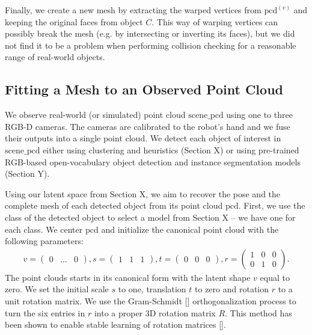 \documentclass{article}
\newcommand{\pcx}[1]{\mathrm{pcd}^{(#1)}}
\begin{document}
Finally, we create a new mesh by extracting the warped vertices from $\pcx{v}$ and keeping the original faces from object $C$. This way of warping vertices can possibly break the mesh (e.g. by intersecting or inverting its faces), but we did not find it to be a problem when performing collision checking for a reasonable range of real-world objects.

\subsection{Fitting a Mesh to an Observed Point Cloud}
\label{sec:methods:scene}

We observe real-world (or simulated) point cloud $\mathrm{scene\_pcd}$ using one to three RGB-D cameras. The cameras are calibrated to the robot's hand and we fuse their outputs into a single point cloud. We detect each object of interest in $\mathrm{scene\_pcd}$ either using clustering and heuristics (Section X) or using pre-trained RGB-based open-vocabulary object detection and instance segmentation models (Section Y).

Using our latent space from Section X, we aim to recover the pose and the complete mesh of each detected object from its point cloud $\mathrm{pcd}$. First, we use the class of the detected object to select a model from Section X -- we have one for each class. We center $\mathrm{pcd}$ and initialize the canonical point cloud with the following parameters:
\begin{align}
    v = \begin{pmatrix} 0 & ... & 0 \end{pmatrix}, s = \begin{pmatrix} 1 & 1 & 1 \end{pmatrix}, t = \begin{pmatrix} 0 & 0 & 0 \end{pmatrix}, r = \begin{pmatrix} 1 & 0 & 0 \\ 0 & 1 & 0 \end{pmatrix}.
\end{align}
The point clouds starts in its canonical form with the latent shape $v$ equal to zero. We set the initial scale $s$ to one, translation $t$ to zero and rotation $r$ to a unit rotation matrix. We use the Gram-Schmidt [] orthogonalization process to turn the six entries in $r$ into a proper 3D rotation matrix $R$. This method has been shown to enable stable learning of rotation matrices [].
\end{document}

